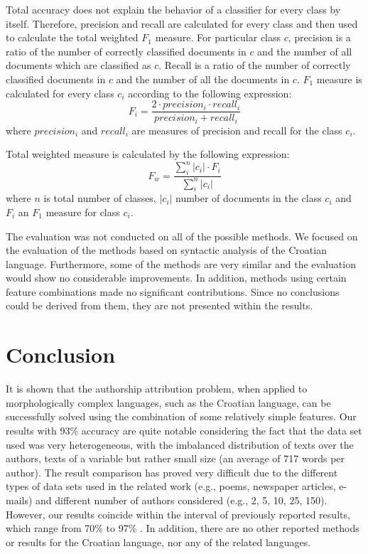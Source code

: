 \documentclass{llncs}
\begin{document}
Total accuracy does not explain the behavior of a classifier for every class by
itself. Therefore, precision and recall are calculated for every class and then
used to calculate the total weighted $F_1$ measure. For particular class $c$,
precision is a ratio of the number of correctly classified documents in $c$ and the number
of all documents which are classified as $c$. Recall is a ratio of the number of correctly
classified documents in $c$ and the number of all the documents in $c$. $F_1$ measure
is calculated for every class $c_i$ according to the following expression:
\begin{equation}
F_i = \frac{2 \cdot precision_i \cdot recall_i}{precision_i + recall_i}
\end{equation}
where $precision_i$ and $recall_i$ are measures of precision and recall for
the class $c_i$.

Total weighted measure is calculated by the following expression:
\begin{equation}
F_w = \frac{\sum^{n}_i |c_i|\cdot F_i}{\sum^n_i|c_i|}
\end{equation}
where $n$ is total number of classes, $|c_i|$ number of documents in the class
$c_i$ and $F_i$ an $F_1$ measure for class $c_i$.

The evaluation was not conducted on all of the possible methods. We focused
on the evaluation of the methods based on syntactic analysis of the Croatian language.
Furthermore, some of the methods are very similar and the evaluation would show no
considerable improvements. %
In addition, methods using certain feature combinations made no significant contributions.
Since no conclusions could be derived from them, they are not presented within the results. 

\section{Conclusion}
It is shown that the authorship attribution problem, when applied to morphologically complex
languages, such as the Croatian language, can be successfully solved using the
combination of some relatively simple features. Our results with 93\% accuracy
are quite notable considering the fact that the data set used was very
heterogeneous, with the imbalanced distribution of texts over the authors, texts
of a variable but rather small size (an average of 717 words per author). The
result comparison has proved very difficult due to the different types of data sets used
in the related work (e.g., poems, newspaper articles, e-mails) and different
number of authors considered (e.g., 2, 5, 10, 25, 150). However, our results
coincide within the interval of previously reported results, which range from
70\% to 97\%
\cite{coyotl2006authorship,keselj2003n,luyckx2005shallow,stamatatos2001computer}.
In addition, there are no other reported methods or results for the Croatian
language, nor any of the related languages.
\end{document}

